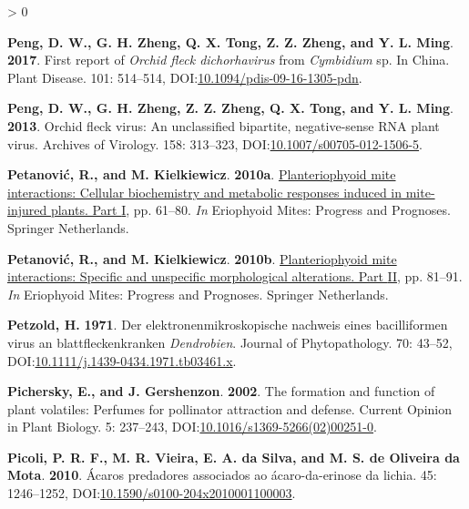 \documentclass{ufdissertation}[overrideChapters] %
\newlength{\cslhangindent}
\newenvironment{CSLReferences}[2] %
 {%
  \setlength{\parindent}{0pt}
  \ifodd #1 \everypar{\setlength{\hangindent}{\cslhangindent}}\ignorespaces\fi
  \ifnum #2 > 0
  \setlength{\parskip}{#2\baselineskip}
  \fi
 }%
 {}
\begin{document}
{\begin{CSLReferences}{1}{1}
\leavevmode{}%
\textbf{Peng, D. W., G. H. Zheng, Q. X. Tong, Z. Z. Zheng, and Y. L. Ming}. \textbf{2017}. First report of {\emph{Orchid fleck dichorhavirus}} from {\emph{Cymbidium}} sp. In {China}. Plant Disease. 101: 514--514, DOI:\href{https://doi.org/10.1094/pdis-09-16-1305-pdn}{10.1094/pdis-09-16-1305-pdn}.

\leavevmode{}%
\textbf{Peng, D. W., G. H. Zheng, Z. Z. Zheng, Q. X. Tong, and Y. L. Ming}. \textbf{2013}. {Orchid fleck virus}: An unclassified bipartite, negative-sense {RNA} plant virus. Archives of Virology. 158: 313--323, DOI:\href{https://doi.org/10.1007/s00705-012-1506-5}{10.1007/s00705-012-1506-5}.

\leavevmode{}%
\textbf{Petanović, R., and M. Kielkiewicz}. \textbf{2010a}. \href{https://doi.org/10.1007/978-90-481-9562-6_4}{Plant{\textendash}eriophyoid mite interactions: Cellular biochemistry and metabolic responses induced in mite-injured plants. Part {I}}, pp. 61--80. \emph{In} Eriophyoid Mites: Progress and Prognoses. Springer Netherlands.

\leavevmode{}%
\textbf{Petanović, R., and M. Kielkiewicz}. \textbf{2010b}. \href{https://doi.org/10.1007/978-90-481-9562-6_5}{Plant{\textendash}eriophyoid mite interactions: Specific and unspecific morphological alterations. Part {II}}, pp. 81--91. \emph{In} Eriophyoid Mites: Progress and Prognoses. Springer Netherlands.

\leavevmode{}%
\textbf{Petzold, H.} \textbf{1971}. Der elektronenmikroskopische nachweis eines bacilliformen virus an blattfleckenkranken {\emph{Dendrobien}}. Journal of Phytopathology. 70: 43--52, DOI:\href{https://doi.org/10.1111/j.1439-0434.1971.tb03461.x}{10.1111/j.1439-0434.1971.tb03461.x}.

\leavevmode{}%
\textbf{Pichersky, E., and J. Gershenzon}. \textbf{2002}. The formation and function of plant volatiles: Perfumes for pollinator attraction and defense. Current Opinion in Plant Biology. 5: 237--243, DOI:\href{https://doi.org/10.1016/s1369-5266(02)00251-0}{10.1016/s1369-5266(02)00251-0}.

\leavevmode{}%
\textbf{Picoli, P. R. F., M. R. Vieira, E. A. da Silva, and M. S. de Oliveira da Mota}. \textbf{2010}. {Á}caros predadores associados ao {á}caro-da-erinose da lichia. 45: 1246--1252, DOI:\href{https://doi.org/10.1590/s0100-204x2010001100003}{10.1590/s0100-204x2010001100003}.


\end{CSLReferences}}
\end{document}

